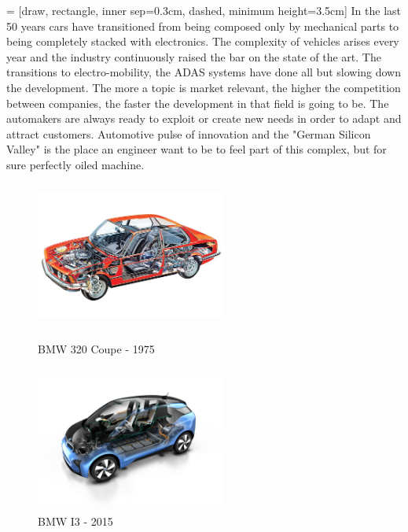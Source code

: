 \documentclass[../main.tex]{subfiles}
\begin{document}
 = [draw, rectangle, inner sep=0.3cm, dashed, minimum height=3.5cm]
In the last 50 years cars have transitioned from being composed only by mechanical parts to being completely stacked with electronics. The complexity of vehicles arises every year and the industry continuously raised the bar on the state of the art. The transitions to electro-mobility, the \gls{ADAS} systems have done all but slowing down the development. The more a topic is market relevant, the higher the competition between companies, the faster the development in that field is going to be. The automakers are always ready to exploit or create new needs in order to adapt and attract customers. Automotive pulse of innovation and the "German Silicon Valley" is the place an engineer want to be to feel part of this complex, but for sure perfectly oiled machine.   
\begin{figure}
\centering
\begin{minipage}{.5\textwidth}
  \centering
  \includegraphics[width=6.3cm, height=4.8cm]{images_folder/4a56e1d50b56da42a10e29d451cf2b93.jpg}
  \caption{\gls{BMW} 320 Coupe - 1975}
  \label{fig:test1}
\end{minipage}%
\begin{minipage}{.5\textwidth}
  \centering
  \includegraphics[width=6.3cm, height=4.8cm]{images_folder/BMW_i3.jpg}
  \caption{\gls{BMW} I3 - 2015}
  \label{fig:test2}
\end{minipage}
\end{figure}
\end{document}
